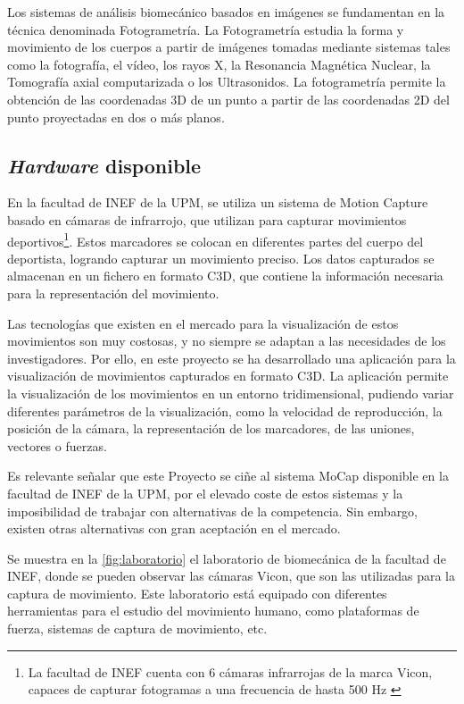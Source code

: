 Los sistemas de análisis biomecánico basados en imágenes se fundamentan en la técnica denominada Fotogrametría. La Fotogrametría estudia la forma y movimiento de los cuerpos a partir de imágenes tomadas mediante sistemas tales como la fotografía, el vídeo, los rayos X, la Resonancia Magnética Nuclear, la Tomografía axial computarizada o los Ultrasonidos. La fotogrametría permite la obtención de las coordenadas 3D de un punto a partir de las coordenadas 2D del punto proyectadas en dos o más planos.

\subsection{\textit{Hardware} disponible}
En la facultad de \ac{INEF} de la \ac{UPM}, se utiliza un sistema de Motion Capture basado en cámaras de infrarrojo, que utilizan para capturar movimientos deportivos\footnote{La facultad de INEF cuenta con 6 cámaras infrarrojas de la marca Vicon, capaces de capturar fotogramas a una frecuencia de hasta 500 \ac{Hz} \autocite{FacultadCienciasActividad}}. Estos marcadores se colocan en diferentes partes del cuerpo del deportista, logrando capturar un movimiento preciso. Los datos capturados se almacenan en un fichero en formato \ac{C3D}, que contiene la información necesaria para la representación del movimiento.

Las tecnologías que existen en el mercado para la visualización de estos movimientos son muy costosas, y no siempre se adaptan a las necesidades de los investigadores. Por ello, en este proyecto se ha desarrollado una aplicación para la visualización de movimientos capturados en formato \ac{C3D}. La aplicación permite la visualización de los movimientos en un entorno tridimensional, pudiendo variar diferentes parámetros de la visualización, como la velocidad de reproducción, la posición de la cámara, la representación de los marcadores, de las uniones, vectores o fuerzas.

Es relevante señalar que este Proyecto se ciñe al sistema \ac{MoCap} disponible en la facultad de INEF de la \ac{UPM}, por el elevado coste de estos sistemas y la imposibilidad de trabajar con alternativas de la competencia. Sin embargo, existen otras alternativas con gran aceptación en el mercado. 

Se muestra en la \autoref{fig:laboratorio} el laboratorio de biomecánica de la facultad de \ac{INEF}, donde se pueden observar las cámaras Vicon, que son las utilizadas para la captura de movimiento. Este laboratorio está equipado con diferentes herramientas para el estudio del movimiento humano, como plataformas de fuerza, sistemas de captura de movimiento, etc.

